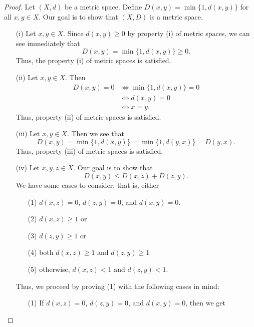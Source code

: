 \documentclass{article}
\begin{document}
\begin{enumerate}
        \begin{proof}
        Let \( (X,d) \) be a metric space. Define \( D(x,y) = \min \{ 1, d(x,y) \}   \) for all \( x,y \in X  \). Our goal is to show that \( (X,D) \) is a metric space. 
        \begin{enumerate}
            \item[(i)] Let \( x,y \in X  \). Since \( d(x,y) \geq 0  \) by property (i) of metric spaces, we can see immediately that
                \[  D(x,y) = \min \{ 1, d(x,y) \} \geq 0. \]
                Thus, the property (i) of metric spaces is satisfied.
            \item[(ii)] Let \( x,y \in X  \). Then
                \begin{align*}
                   D(x,y) = 0  &\Longleftrightarrow \min \{ 1, d(x,y) \} = 0  \\
                               &\Longleftrightarrow d(x,y) = 0 \\
                               &\Longleftrightarrow x = y. \tag{\( (X,d) \) is a metric space}
                \end{align*}
                Thus, property (ii) of metric spaces is satisfied.
            \item[(iii) ] Let \( x,y \in X  \). Then we see that
                \[  D(x,y) = \min \{ 1 , d(x,y)  \}  = \min \{ 1 , d(y,x) \}  = D(y,x). \]
                Thus, property (iii) of metric spaces is satisfied.
            \item[(iv)] Let \( x,y,z \in X  \). Our goal is to show that 
                \[  D(x,y) \leq D(x,z) + D(z,y). \tag{1} \]
                We have some cases to consider; that is, either
                \begin{enumerate}
                    \item[(1)] \( d(x,z) = 0  \), \( d(z,y) = 0  \), and \( d(x,y) = 0 \).
                    \item[(2)] \( d(x,z) \geq 1  \) or  
                    \item[(3)] \( d(z,y) \geq 1  \) or
                    \item[(4)] both \( d(x,z) \geq 1 \) and \( d(z,y) \geq 1  \)
                    \item[(5)] otherwise, \( d(x,z) < 1  \) and \( d(z,y) < 1  \).
                \end{enumerate}
                Thus, we proceed by proving (1) with the following cases in mind:
                \begin{enumerate}
                    \item[(1)] If \( d(x,z) = 0  \), \( d(z,y) = 0  \), and \( d(x,y) = 0  \), then we get

\end{enumerate}
\end{enumerate}
\end{proof}
\end{enumerate}
\end{document}
